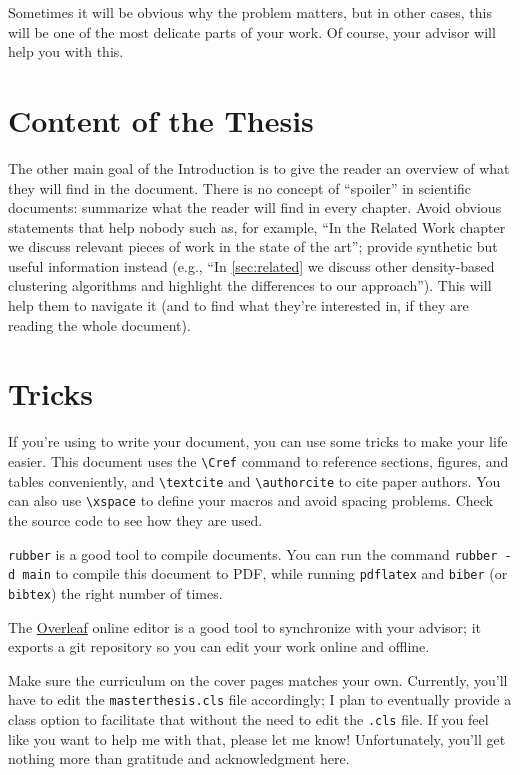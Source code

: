 Sometimes it will be obvious why the problem matters, but in other cases, this will be
one of the most delicate parts of your work. Of course, your advisor will help you with this.

\section{Content of the Thesis}

The other main goal of the Introduction is to give the reader an overview of what they will
find in the document. There is no concept of ``spoiler'' in scientific documents: summarize
what the reader will find in every chapter. Avoid obvious statements that help nobody such as, for example, ``In the Related Work chapter we discuss relevant pieces of work in the state of the art''; provide synthetic but useful information instead (e.g., ``In \cref{sec:related} we discuss other density-based clustering algorithms and highlight the differences to our approach''). This will help them to navigate it (and to find what they're interested in, if they are reading the whole document).

\section{\latex Tricks}

If you're using \latex to write your document, you can use some tricks to make your life
easier. This document uses the \verb|\Cref| command to reference sections, figures, and tables conveniently, and \verb|\textcite| and
\verb|\authorcite| to cite paper authors. You can also use \verb|\xspace| to define your macros
and avoid spacing problems. Check the source code to see how they are used.

\texttt{rubber} is a good tool to compile \latex documents. You can run the command
\texttt{rubber -d main} to compile this document to PDF, while running \texttt{pdflatex}
and \texttt{biber} (or \texttt{bibtex}) the right number of times.

The \href{https://www.overleaf.com}{Overleaf} online editor is a good tool to synchronize with
your advisor; it exports a git repository so you can edit your work online and offline.

Make sure the curriculum on the cover pages matches your own. Currently, you'll have to edit the \texttt{masterthesis.cls} file accordingly; I plan to eventually provide a class option to facilitate that without the need to edit the \texttt{.cls} file. If you feel like you want to help me with that, please let me know! Unfortunately, you'll get nothing more than gratitude and acknowledgment here.
